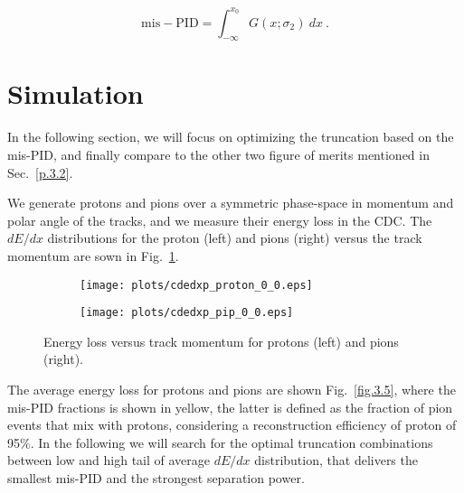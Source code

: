 \begin{equation}
    \label{eq.3.3.2}
    \mathrm{mis-PID} = \int_{-\infty}^{x_{0}} G(x;\sigma_{2})~dx~.
\end{equation}

\section{Simulation}
\label{p.3.3}

In the following section, we will focus on optimizing the truncation based on the mis-PID, and finally compare to the other two figure of merits mentioned in Sec.~\ref{p.3.2}.
~\par We generate protons and pions over a symmetric phase-space in momentum and polar angle of the tracks, and we measure their energy loss in the CDC. The $dE/dx$ distributions for the proton (left) and pions (right) versus the track momentum are sown in Fig.~\ref{fig.3.4}.

\begin{figure}[H]
    \centering
    \begin{subfigure}[b]{0.45\textwidth}
        \texttt{[image: plots/cdedxp\_proton\_0\_0.eps]}
    \end{subfigure}\hfill
    \begin{subfigure}[b]{0.45\textwidth}
        \texttt{[image: plots/cdedxp\_pip\_0\_0.eps]}
    \end{subfigure}
    \caption{Energy loss versus track momentum for protons (left) and pions (right).}
    \label{fig.3.4}
\end{figure}

The average energy loss for protons and pions are shown Fig.~\ref{fig.3.5}, where the mis-PID fractions is shown in yellow, the latter is defined as the fraction of pion events that mix with protons, considering a reconstruction efficiency of proton of 95$\%$. In the following we will search for the optimal truncation combinations between low and high tail of average $dE/dx$ distribution, that delivers the smallest mis-PID and the strongest separation power.

